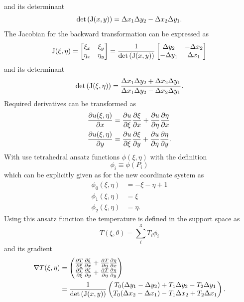 and its determinant
\begin{equation}
	\det\left(\mathrm{J}(x, y)\right) = \Delta x_1 \Delta y_2 - \Delta x_2 \Delta y_1.
\end{equation}
The Jacobian for the backward transformation can be expressed as
\begin{equation}
	\mathrm{J}(\xi, \eta) = 
	\begin{bmatrix}
	\xi_{x} & \xi_{y} \\
	\eta_{x} & \eta_{y}
	\end{bmatrix}
	= \frac{1}{\det\left(\mathrm{J}(x,y)\right)}
	\begin{bmatrix}
	\Delta y_{2} & -\Delta x_{2}\\
	-\Delta y_{1} & \Delta x_{1}
	\end{bmatrix}
\end{equation}
and its determinant
\begin{equation}
	\det\left( \mathrm{J}(\xi, \eta) \right) = \frac{\Delta x_1 \Delta y_2 + \Delta x_2 \Delta y_1}{\Delta x_1 \Delta y_2 - \Delta x_2 \Delta y_1}.
\end{equation}
Required derivatives can be transformed as
\begin{align}
	\pdv{u(\xi, \eta)}{x} &= \pdv{u}{\xi}\pdv{\xi}{x} + \pdv{u}{\eta}\pdv{\eta}{x}\\
	\pdv{u(\xi, \eta)}{y} &= \pdv{u}{\xi}\pdv{\xi}{y} + \pdv{u}{\eta}\pdv{\eta}{y}.
\end{align}
With use tetrahedral ansatz functions $\phi(\xi, \eta)$ with the definition
\begin{equation}
	\phi_i \equiv \phi(P_i)
\end{equation}
which can be explicitly given as for the new coordinate system as
\begin{align}
	\phi_0(\xi, \eta) &= -\xi - \eta  + 1\\
	\phi_1(\xi, \eta) &= \xi\\
	\phi_2(\xi, \eta) &= \eta.
\end{align}
Using this ansatz function the temperature is defined in the support space as
\begin{equation}
	T(\xi, \theta)  = \sum_i^3 T_i \phi_i
\end{equation}
and its gradient
\begin{align}
	\label{eqn:grad_T}
	\begin{split}
	\nabla T(\xi, \eta) &=
	\begin{pmatrix}
	\pdv{T}{\xi}\pdv{\xi}{x} + \pdv{T}{\eta}\pdv{\eta}{x}\\
	\pdv{T}{\xi}\pdv{\xi}{y} + \pdv{T}{\eta}\pdv{\eta}{y}
	\end{pmatrix}\\
	&= \frac{1}{\det\left(\mathrm{J}(x,y)\right)}
	\begin{pmatrix}
	T_0(\Delta y_1 - \Delta y_2) + T_1\Delta y_2 - T_2\Delta y_1\\
	T_0(\Delta x_2 - \Delta x_1) - T_1 \Delta x_2 + T_2 \Delta x_1
	\end{pmatrix}.
	\end{split}
\end{align}
